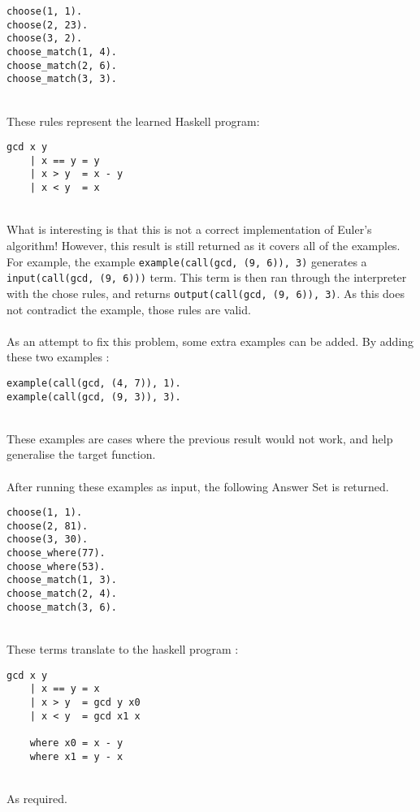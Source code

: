 \begin{multicols}{2}
\begin{lstlisting}
choose(1, 1).
choose(2, 23).
choose(3, 2).
choose_match(1, 4).
choose_match(2, 6).
choose_match(3, 3).
\end{lstlisting}
\end{multicols}
\mbox{}\\
These rules represent the learned Haskell program: \\

\begin{lstlisting}
gcd x y
	| x == y = y
	| x > y  = x - y
	| x < y  = x
\end{lstlisting}
\mbox{}\\
What is interesting is that this is not a correct implementation of Euler's algorithm! However, this result is still returned as it covers all of the examples. For example, the example \lstinline{example(call(gcd, (9, 6)), 3)} generates a \lstinline{input(call(gcd, (9, 6)))} term. This term is then ran through the interpreter with the chose rules, and returns \lstinline{output(call(gcd, (9, 6)), 3)}. As this does not contradict the example, those rules are valid. \\ \\%
As an attempt to fix this problem, some extra examples can be added. By adding these two examples :\\

\begin{lstlisting}
example(call(gcd, (4, 7)), 1).
example(call(gcd, (9, 3)), 3).
\end{lstlisting}
\mbox{}\\
These examples are cases where the previous result would not work, and help generalise the target function. \\ \\
After running these examples as input, the following Answer Set is returned. \\

\begin{lstlisting}
choose(1, 1).
choose(2, 81).
choose(3, 30).
choose_where(77).
choose_where(53).
choose_match(1, 3).
choose_match(2, 4).
choose_match(3, 6).
\end{lstlisting}
\mbox{} \\
These terms translate to the haskell program :

\begin{lstlisting}
gcd x y
	| x == y = x
	| x > y  = gcd y x0
	| x < y  = gcd x1 x
	
	where x0 = x - y
	where x1 = y - x
\end{lstlisting}
\mbox{}\\
As required.

